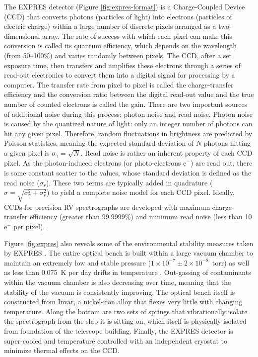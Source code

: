The EXPRES detector (Figure \ref{fig:expres-format}) is a Charge-Coupled Device (CCD) that converts photons (particles of light) into electrons (particles of electric charge) within a large number of discrete pixels arranged as a two-dimensional array. The rate of success with which each pixel can make this conversion is called its quantum efficiency, which depends on the wavelength (from 50--100\%) and varies randomly between pixels. The CCD, after a set exposure time, then transfers and amplifies these electrons through a series of read-out electronics to convert them into a digital signal for processing by a computer. The transfer rate from pixel to pixel is called the charge-transfer efficiency and the conversion ratio between the digital read-out value and the true number of counted electrons is called the gain. There are two important sources of additional noise during this process: photon noise and read noise. Photon noise is caused by the quantized nature of light: only an integer number of photons can hit any given pixel. Therefore, random fluctuations in brightness are predicted by Poisson statistics, meaning the expected standard deviation of $N$ photons hitting a given pixel is $\sigma_\gamma=\sqrt{N}$. Read noise is rather an inherent property of each CCD pixel. As the photon-induced electrons (or photo-electrons $\mathrm{e^-}$) are read out, there is some constant scatter to the values, whose standard deviation is defined as the read noise ($\sigma_r$). These two terms are typically added in quadrature ($\sigma=\sqrt{\sigma_\gamma^2 + \sigma_r^2}$) to yield a complete noise model for each CCD pixel. Ideally, CCDs for precision RV spectrographs are developed with maximum charge-transfer efficiency (greater than 99.9999\%) and minimum read noise (less than 10 $\mathrm{e^-}$ per pixel).

Figure \ref{fig:expres} also reveals some of the environmental stability measures taken by EXPRES \citep{jurgenson_expres_2016}. The entire optical bench is built within a large vacuum chamber to maintain an extremely low and stable pressure ($1\times 10^{-7} \pm 2\times 10^{-8}$~torr) as well as less than 0.075~\si{\kelvin} per day drifts in temperature \citep{blackman_performance_2020}. Out-gassing of contaminants within the vacuum chamber is also decreasing over time, meaning that the stability of the vacuum is consistently improving. The optical bench itself is constructed from Invar, a nickel-iron alloy that flexes very little with changing temperature. Along the bottom are two sets of springs that vibrationally isolate the spectrograph from the slab it is sitting on, which itself is physically isolated from foundation of the telescope building. Finally, the EXPRES detector is super-cooled and temperature controlled with an independent cryostat to minimize thermal effects on the CCD.


